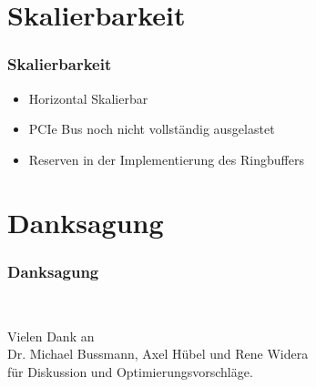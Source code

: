 \documentclass[ddcfooter]{tudbeamer}
\begin{document}
\section{Skalierbarkeit}
\begin{frame}
    \frametitle*{Skalierbarkeit}
    \begin{itemize}
        \item{Horizontal Skalierbar}
        \item{PCIe Bus noch nicht vollständig ausgelastet}
        \item{Reserven in der Implementierung des Ringbuffers}
    \end{itemize}

\end{frame}
\section{Danksagung}

\begin{frame}
    \frametitle*{Danksagung}
    \begin{block} ~
    \begin{center}
    Vielen Dank an \\Dr. Michael Bussmann, Axel Hübel und Rene Widera \\ für Diskussion und Optimierungsvorschläge.
    \end{center}
    \end{block}

\end{frame}
\end{document}
